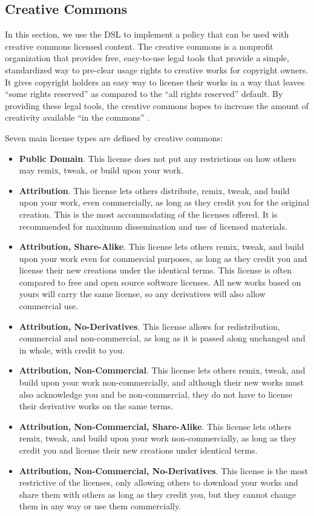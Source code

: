 \subsection{Creative Commons}\label{sec:model-cc}
In this section, we use the DSL to implement a policy that can be used with creative commons licensed content.  The creative commons is a nonprofit organization that provides free, easy-to-use legal tools that provide a simple, standardized way to pre-clear usage rights to creative works for copyright owners.  It gives copyright holders an easy way to license their works in a way that leaves ``some rights reserved'' as compared to the ``all rights reserved'' default.  By providing these legal tools, the creative commons hopes to increase the amount of creativity available ``in the commons'' \cite{creative-commons}.

Seven main license types are defined by creative commons:

\begin{itemize}
\item \textbf{Public Domain}. This license does not put any restrictions on how others may remix, tweak, or build upon your work.
\item \textbf{Attribution}.  This license lets others distribute, remix, tweak, and build upon your work, even commercially, as long as they credit you for the original creation. This is the most accommodating of the licenses offered.  It is recommended for maximum dissemination and use of licensed materials.
\item \textbf{Attribution, Share-Alike}.  This license lets others remix, tweak, and build upon your work even for commercial purposes, as long as they credit you and license their new creations under the identical terms.  This license is often compared to free and open source software licenses.  All new works based on yours will carry the same license, so any derivatives will also allow commercial use.
\item \textbf{Attribution, No-Derivatives}.  This license allows for redistribution, commercial and non-commercial, as long as it is passed along unchanged and in whole, with credit to you.
\item \textbf{Attribution, Non-Commercial}.  This license lets others remix, tweak, and build upon your work non-commercially, and although their new works must also acknowledge you and be non-commercial, they do not have to license their derivative works on the same terms.
\item \textbf{Attribution, Non-Commercial, Share-Alike}.  This license lets others remix, tweak, and build upon your work non-commercially, as long as they credit you and license their new creations under identical terms.
\item \textbf{Attribution, Non-Commercial, No-Derivatives}.  This license is the most restrictive of the licenses, only allowing others to download your works and share them with others as long as they credit you, but they cannot change them in any way or use them commercially.
\end{itemize}

